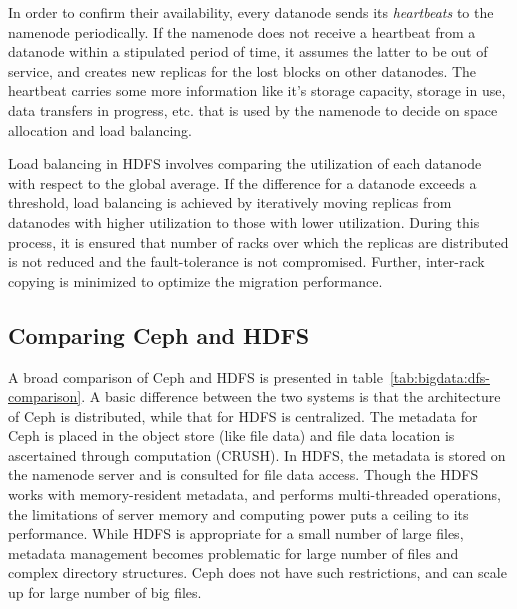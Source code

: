 In order to confirm their availability, every datanode sends its {\em heartbeats} to the namenode periodically. If the namenode does 
not receive a heartbeat from a datanode within a stipulated period of time, it assumes the latter to be out of service, and creates 
new replicas for the lost blocks on other datanodes. The heartbeat carries some more information like it's storage capacity, storage 
in use, data transfers in progress, etc. that is used by the namenode to decide on space allocation and load balancing.

Load balancing in HDFS involves comparing the utilization of each datanode with respect to the global average. If the difference for
a datanode exceeds a threshold, load balancing is achieved by iteratively moving replicas from datanodes with higher utilization to 
those with lower utilization. During this process, it is ensured that number of racks over which the replicas are distributed is not
reduced and the fault-tolerance is not compromised. Further, inter-rack copying is minimized to optimize the migration performance.

\subsection{Comparing Ceph and HDFS}

  
A broad comparison of Ceph and HDFS is presented in table~\ref{tab:bigdata:dfs-comparison}. A basic difference between the two 
systems is that the architecture of Ceph is distributed, while that for HDFS is centralized. The metadata for Ceph is placed
in the object store (like file data) and file data location is ascertained through computation (CRUSH). In HDFS, the metadata 
is stored on the namenode server and is consulted for file data access. Though the HDFS works with memory-resident metadata,
and performs multi-threaded operations,
the limitations of server memory and computing power puts a ceiling to its performance. While HDFS is appropriate for a small
number of large files, metadata management becomes problematic for large number of files and complex directory structures.
Ceph does not have such restrictions, and can scale up for large number of big files.

